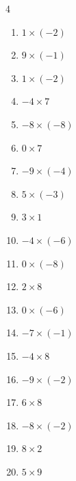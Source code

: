 \begin{multicols}{4}
\begin{enumerate}
  \item $1\times (-2)$
        \phantom{$=-2$}

  \item $9\times (-1)$
        \phantom{$=-9$}

  \item $1\times (-2)$
        \phantom{$=-2$}

  \item $-4\times 7$
        \phantom{$=-28$}

  \item $-8\times (-8)$
        \phantom{$=64$}

  \item $0\times 7$
        \phantom{$=0$}

  \item $-9\times (-4)$
        \phantom{$=36$}

  \item $5\times (-3)$
        \phantom{$=-15$}

  \item $3\times 1$
        \phantom{$=3$}

  \item $-4\times (-6)$
        \phantom{$=24$}

  \item $0\times (-8)$
        \phantom{$=0$}

  \item $2\times 8$
        \phantom{$=16$}

  \item $0\times (-6)$
        \phantom{$=0$}

  \item $-7\times (-1)$
        \phantom{$=7$}

  \item $-4\times 8$
        \phantom{$=-32$}

  \item $-9\times (-2)$
        \phantom{$=18$}

\columnbreak %

  \item $6\times 8$
        \phantom{$=48$}

  \item $-8\times (-2)$
        \phantom{$=16$}

  \item $8\times 2$
        \phantom{$=16$}

  \item $5\times 9$
        \phantom{$=45$}


\end{enumerate}
\end{multicols}
